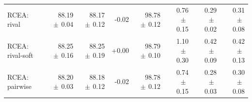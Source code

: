 \begin{tabular}{lrrrrrrr}
RCEA: rival & 88.19{\scriptsize$\,\pm\,$0.04} & 88.17{\scriptsize$\,\pm\,$0.12} & -0.02 & 98.78{\scriptsize$\,\pm\,$0.12} & 0.76{\scriptsize$\,\pm\,$0.15} & 0.29{\scriptsize$\,\pm\,$0.02} & 0.31{\scriptsize$\,\pm\,$0.08} \\
RCEA: rival-soft & 88.25{\scriptsize$\,\pm\,$0.16} & 88.25{\scriptsize$\,\pm\,$0.19} & +0.00 & 98.79{\scriptsize$\,\pm\,$0.10} & 1.10{\scriptsize$\,\pm\,$0.30} & 0.42{\scriptsize$\,\pm\,$0.09} & 0.42{\scriptsize$\,\pm\,$0.13} \\
RCEA: pairwise & 88.20{\scriptsize$\,\pm\,$0.03} & 88.18{\scriptsize$\,\pm\,$0.12} & -0.02 & 98.78{\scriptsize$\,\pm\,$0.12} & 0.74{\scriptsize$\,\pm\,$0.15} & 0.28{\scriptsize$\,\pm\,$0.03} & 0.30{\scriptsize$\,\pm\,$0.08} \\
\bottomrule
\end{tabular}
